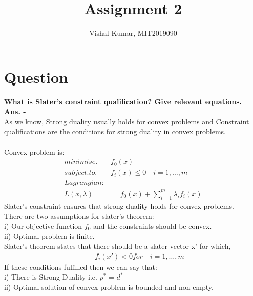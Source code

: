 \documentclass[fleqn]{article}
\title{Assignment 2}
\author{Vishal Kumar, MIT2019090}
\date{}
\begin{document}
\maketitle
\section*{Question}
{\bf What is Slater’s constraint qualification? Give relevant equations.}
\\
{\bf Ans. -} 
\\
As we know, Strong duality usually holds for convex problems and Constraint qualifications are the conditions for strong duality in convex problems.
\\
\\
Convex problem is:
\begin{align*}
minimise. \quad& f_0(x)\\
subject.to. \quad& f_i(x) \le 0  \quad i=1,\ldots,m
\\
Lagrangian:\\
L(x,\lambda) &= f_0(x) + \sum_{i=1}^m \lambda_i f_i(x)
\end{align*}
Slater's constraint ensures that strong duality holds for convex problems.
\\
There are two assumptions for slater's theorem:
\\
i) Our objective function $f_{0}$ and the constraints should be convex.
\\
ii) Optimal problem is finite.
\\
Slater's theorem states that there should be a slater vector x' for which,
\begin{align*}
\quad& f_i(x') < 0 for \quad i=1,\ldots,m
\end{align*}
If these conditions fulfilled then we can say that:
\\
i) There is Strong Duality i.e. $p^*$ = $d^*$
\\
ii) Optimal solution of convex problem is bounded and non-empty.
\end{document}
